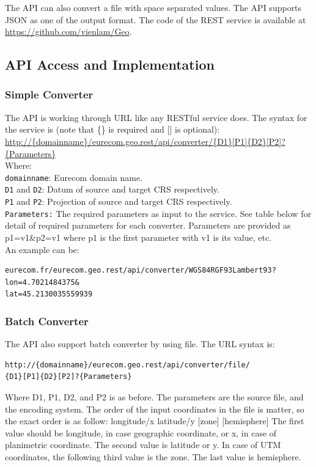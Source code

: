 The API can also convert a file with space separated values. The API supports JSON as one of the output format. The code of the REST service is available at \url{https://github.com/vienlam/Geo}.

 


\subsection{API Access and Implementation}
\label{sec:access}

\subsubsection{Simple Converter}
The API is working through URL like any RESTful service does. The syntax for the service is (note that \{\} is required and [] is optional):
\url{http://{domainname}/eurecom.geo.rest/api/converter/{D1}[P1]{D2}[P2]?{Parameters}} \\
Where: \\
\texttt{domainname}: Eurecom domain name.\\
\texttt{D1} and \texttt{D2}: Datum of source and target CRS respectively.\\
\texttt{P1} and \texttt{P2}: Projection of source and target CRS respectively.\\
\texttt{Parameters:} The required parameters as input to the service. See table below for detail of required parameters for each converter. Parameters are provided as p1=v1\&p2=v1 where p1 is the first parameter with v1 is its value, etc.\\
An example can be:
\begin{verbatim}
eurecom.fr/eurecom.geo.rest/api/converter/WGS84RGF93Lambert93?lon=4.7021484375&
lat=45.2130035559939
\end{verbatim}

\subsubsection{Batch Converter}
The API also support batch converter by using file. The URL syntax is:
\begin{verbatim}
http://{domainname}/eurecom.geo.rest/api/converter/file/
{D1}[P1]{D2}[P2]?{Parameters}
\end{verbatim}

Where D1, P1, D2, and P2 is as before. The parameters are the source file, and the encoding system. 
The order of the input coordinates in the file is matter, so the exact order is as follow:
{longitude/x} {latitude/y} [zone] [hemisphere]
The first value should be longitude, in case geographic coordinate, or x, in case of planimetric coordinate. The second value is latitude or y. In case of UTM coordinates, the following third value is the zone. The last value is hemisphere. 

